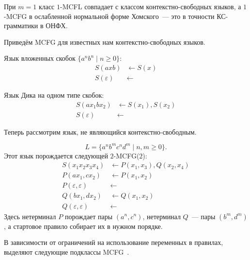 \begin{remark}
    При $m=1$ класс $1$-MCFL совпадает с классом контекстно-свободных языков, а $1$-MCFG в ослабленной нормальной форме Хомского~--- это в точности КС-грамматики в ОНФХ.
\end{remark}

Приведём MCFG для известных нам контекстно-свободных языков.

\begin{example}
    Язык вложенных скобок $\{a^n b^n \mid n \ge 0\}$:
    \begin{align}
        S(axb) &\leftarrow S(x) \nonumber \\
        S(\varepsilon) &\leftarrow \nonumber
    \end{align}
\end{example}

\begin{example}
    Язык Дика на одном типе скобок:
    \begin{align}
        S(ax_1bx_2) &\leftarrow S(x_1), S(x_2) \nonumber \\
        S(\varepsilon) &\leftarrow \nonumber
    \end{align}
\end{example}

Теперь рассмотрим язык, не являющийся контекстно-свободным.
\begin{example}
\[
L = \{a^n b^m c^n d^m \mid n, m \ge 0\}.
\]
Этот язык порождается следующей $2$-MCFG($2$):
\begin{align*}
    S(x_1 x_2 x_3 x_4) &\leftarrow P(x_1,x_3), Q(x_2,x_4) \\
    P(ax_1, cx_2) &\leftarrow P(x_1,x_2) \\
    P(\varepsilon,\varepsilon) &\leftarrow \\
    Q(bx_1, dx_2) &\leftarrow Q(x_1,x_2) \\
    Q(\varepsilon,\varepsilon) &\leftarrow
\end{align*}
Здесь нетерминал $P$ порождает пары $(a^n, c^n)$, нетерминал $Q$~--- пары $(b^m, d^m)$, а стартовое правило собирает их в нужном порядке.
\end{example}


В зависимости от ограничений на использование переменных в правилах, выделяют следующие подклассы MCFG~.


